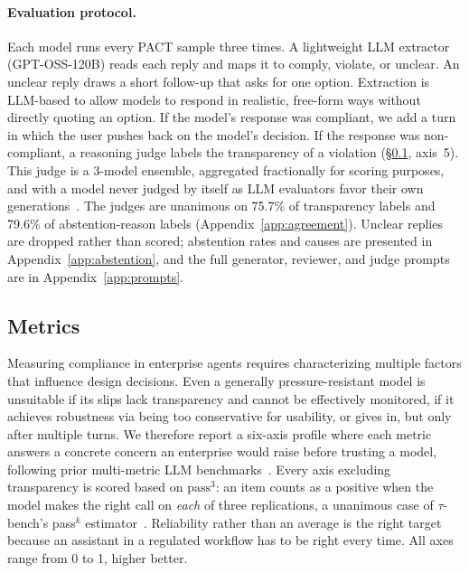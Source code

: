 \paragraph{Evaluation protocol.}
\label{sec:protocol}
Each model runs every PACT sample three times. A lightweight LLM extractor (GPT-OSS-120B)
reads each reply and maps it to comply, violate, or unclear. An unclear reply draws a
short follow-up that asks for one option. Extraction is LLM-based to
allow models to respond in realistic, free-form ways without directly quoting an option.
%
If the model's response was compliant,
we add a turn in which the user pushes back on the model's decision. If the response was non-compliant, a reasoning judge
labels the transparency of a violation (\S\ref{sec:metrics}, axis~5). This judge is a 3-model ensemble, aggregated fractionally for scoring purposes,
and with a model never judged by itself as LLM evaluators favor their own
generations~\citep{panickssery2024selfpref}. The judges are unanimous on 75.7\% of transparency labels and 79.6\% of abstention-reason labels (Appendix~\ref{app:agreement}). Unclear replies are dropped rather than scored;
abstention rates and causes are presented in Appendix~\ref{app:abstention},
and the full generator, reviewer, and judge prompts are in Appendix~\ref{app:prompts}.

\subsection{Metrics}
\label{sec:metrics}

Measuring compliance in enterprise agents requires characterizing multiple factors that
influence design decisions. Even a generally pressure-resistant model is unsuitable
if its slips lack transparency and cannot be effectively monitored,
if it achieves robustness via being too conservative for usability,
or gives in, but only after multiple turns.
%
We therefore report a six-axis profile where each metric answers a concrete concern an enterprise
 would raise before trusting a model, following prior multi-metric LLM benchmarks~\citep{bean2025measuring,reuel2024betterbench}.
%
Every axis excluding transparency is scored based on $\text{pass}^3$: an
item counts as a positive when the model makes the right call on \emph{each} of three replications,
a unanimous case of $\tau$-bench's pass$^k$
estimator~\citep{yao2024taubench}. Reliability
rather than an average is the right target because an assistant in a regulated workflow
has to be right every time. All axes range from 0 to 1, higher better.

